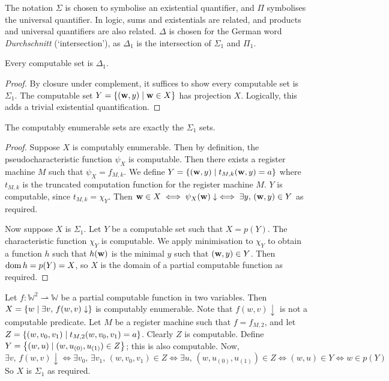 \begin{remark}
	The notation \( \Sigma \) is chosen to symbolise an existential quantifier, and \( \Pi \) symbolises the universal quantifier.
	In logic, sums and existentials are related, and products and universal quantifiers are also related.
	\( \Delta \) is chosen for the German word \emph{Durchschnitt} (`intersection'), as \( \Delta_1 \) is the intersection of \( \Sigma_1 \) and \( \Pi_1 \).
\end{remark}
\begin{proposition}
	Every computable set is \( \Delta_1 \).
\end{proposition}
\begin{proof}
	By closure under complement, it suffices to show every computable set is \( \Sigma_1 \).
	The computable set \( Y = \qty{(\vb w, y) \mid \vb w \in X} \) has projection \( X \).
	Logically, this adds a trivial existential quantification.
\end{proof}
\begin{theorem}
	The computably enumerable sets are exactly the \( \Sigma_1 \) sets.
\end{theorem}
\begin{proof}
	Suppose \( X \) is computably enumerable.
	Then by definition, the pseudocharacteristic function \( \psi_X \) is computable.
	Then there exists a register machine \( M \) such that \( \psi_X = f_{M,k} \).
	We define \( Y = \qty{(\vb w, y) \mid t_{M,k}(\vb w, y) = a} \) where \( t_{M,k} \) is the truncated computation function for the register machine \( M \).
	\( Y \) is computable, since \( t_{M,k} = \chi_Y \).
	Then \( \vb w \in X \iff \psi_X(\vb w) \downarrow \iff \exists y,\, (\vb w, y) \in Y \) as required.

	Now suppose \( X \) is \( \Sigma_1 \).
	Let \( Y \) be a computable set such that \( X = p(Y) \).
	The characteristic function \( \chi_Y \) is computable.
	We apply minimisation to \( \chi_Y \) to obtain a function \( h \) such that \( h(\vb w) \) is the minimal \( y \) such that \( (\vb w, y) \in Y \).
	Then \( \operatorname{dom} h = p(Y) = X \), so \( X \) is the domain of a partial computable function as required.
\end{proof}
\begin{example}
	Let \( f \colon \mathbb W^2 \rightharpoonup \mathbb W \) be a partial computable function in two variables.
	Then \( X = \qty{w \mid \exists v,\, f(w, v) \downarrow} \) is computably enumerable.
	Note that \( f(w, v) \downarrow \) is not a computable predicate.
	Let \( M \) be a register machine such that \( f = f_{M,2} \), and let \( Z = \qty{(w, v_0, v_1) \mid t_{M,2}(w,v_0,v_1) = a} \).
	Clearly \( Z \) is computable.
	Define \( Y = \qty{(w, u) \mid (w, u_{(0)}, u_{(1)}) \in Z} \); this is also computable.
	Now,
	\[ \exists v,\, f(w,v) \downarrow \iff \exists v_0,\, \exists v_1,\, (w,v_0,v_1) \in Z \iff \exists u,\, (w,u_{(0)},u_{(1)}) \in Z \iff (w,u) \in Y \iff w \in p(Y) \]
	So \( X \) is \( \Sigma_1 \) as required.
\end{example}
